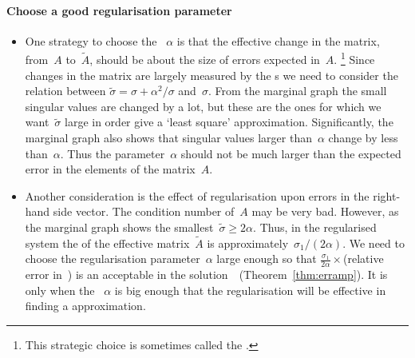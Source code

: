 \paragraph{Choose a good regularisation parameter}
\begin{itemize}
\item One strategy to choose the ~\(\alpha\) is that the effective change in the matrix, from~\(A\) to~\(\tilde A\), should be about the size of errors expected in~\(A\).
\footnote{This strategic choice is sometimes called the  \cite[\S7]{Kress2015}.}
Since changes in the matrix are largely measured by the s we need to consider the relation between \(\tilde\sigma=\sigma+\alpha^2/\sigma\) and~\(\sigma\).
From the marginal graph the small singular values are changed by a lot, but these are the ones for which we want~\(\tilde\sigma\) large in order give a `least square' approximation.
Significantly, the marginal graph also shows that singular values larger than~\(\alpha\) change by less than~\(\alpha\).
Thus the parameter~\(\alpha\) should not be much larger than the expected error in the elements of the matrix~\(A\).

\item Another consideration is the effect of regularisation upon errors in the right-hand side vector.
The condition number of~\(A\) may be very bad.
However, as the marginal graph shows the smallest~\(\tilde\sigma\geq2\alpha\).
Thus, in the regularised system the  of the effective matrix~\(\tilde A\) is approximately~\(\sigma_1/(2\alpha)\).
We need to choose the regularisation parameter~\(\alpha\) large enough so that \(\frac{\sigma_1}{2\alpha}\times\)(relative error in~\bv) is an acceptable  in the solution~\xv\ (Theorem~\ref{thm:erramp}).
It is only when the ~\(\alpha\) is big enough that the regularisation will be effective in finding a  approximation. 

\end{itemize}








